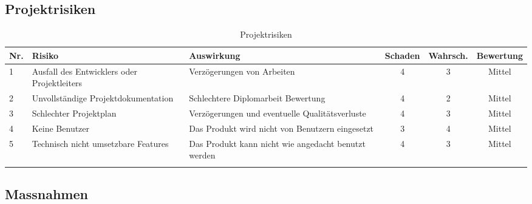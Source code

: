 \clearpage
\subsection{Projektrisiken}\label{projektrisiken}

\begin{longtable}[]{@{}lp{3cm}p{4cm}ccc@{}}
  \toprule
  \textbf{Nr.} & \textbf{Risiko}                             & \textbf{Auswirkung}                                 & \textbf{Schaden} & \textbf{Wahrsch.} & \textbf{Bewertung}\tabularnewline
  \midrule
  \endhead
  1            & Ausfall des Entwicklers oder Projektleiters & Verzögerungen von Arbeiten                          & 4                & 3                 & Mittel\tabularnewline
  2            & Unvollständige Projektdokumentation         & Schlechtere Diplomarbeit Bewertung                  & 4                & 2                 & Mittel\tabularnewline
  3            & Schlechter Projektplan                      & Verzögerungen und eventuelle Qualitätsverluste      & 4                & 3                 & Mittel\tabularnewline
  4            & Keine Benutzer                              & Das Produkt wird nicht von Benutzern eingesetzt     & 3                & 4                 & Mittel\tabularnewline
  5            & Technisch nicht umsetzbare Features         & Das Produkt kann nicht wie angedacht benutzt werden & 4                & 3                 & Mittel\tabularnewline
  \bottomrule
  \caption{Projektrisiken}
\end{longtable}

\clearpage
\subsection{Massnahmen}\label{massnahmen}


